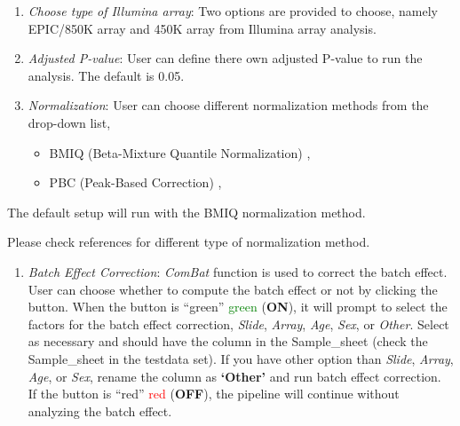 \documentclass[
  a4paper,
  DIV=11,
  numbers=noendperiod,
  oneside,
  open=any]{scrreport}
\providecommand{\tightlist}{%
  \setlength{\itemsep}{0pt}\setlength{\parskip}{0pt}}\usepackage{longtable,booktabs,array}
\begin{document}
\begin{enumerate}
\def\labelenumi{\arabic{enumi}.}
\item
  \emph{Choose type of Illumina array}: Two options are provided to
  choose, namely EPIC/850K array and 450K array from Illumina array
  analysis.
\item
  \emph{Adjusted P-value}: User can define there own adjusted P-value to
  run the analysis. The default is 0.05.
\item
  \emph{Normalization}: User can choose different normalization methods
  from the drop-down list,

  \begin{itemize}
  \tightlist
  \item
    BMIQ (Beta-Mixture Quantile Normalization)
    \autocite{teschendorff2013beta},
  \item
    PBC (Peak-Based Correction) \autocite{dedeurwaerder2011evaluation},
  \end{itemize}
\end{enumerate}

The default setup will run with the BMIQ normalization method.

\begin{tcolorbox}[enhanced jigsaw, breakable, colback=white, colbacktitle=quarto-callout-tip-color!10!white, opacityback=0, left=2mm, bottomrule=.15mm, opacitybacktitle=0.6, coltitle=black, bottomtitle=1mm, toprule=.15mm, toptitle=1mm, arc=.35mm, titlerule=0mm, rightrule=.15mm, title=\textcolor{quarto-callout-tip-color}{\faLightbulb}\hspace{0.5em}{Tip}, colframe=quarto-callout-tip-color-frame, leftrule=.75mm]

Please check references for different type of normalization method.

\end{tcolorbox}

\begin{enumerate}
\def\labelenumi{\arabic{enumi}.}
\setcounter{enumi}{3}
\tightlist
\item
  \emph{Batch Effect Correction}: \emph{ComBat} function is used to
  correct the batch effect. User can choose whether to compute the batch
  effect or not by clicking the button. When the button is {``green''}
  \textcolor{green}{green} (\textbf{ON}), it will prompt to select the
  factors for the batch effect correction, \emph{Slide}, \emph{Array},
  \emph{Age}, \emph{Sex}, or \emph{Other}. Select as necessary and
  should have the column in the Sample\_sheet (check the Sample\_sheet
  in the testdata set). If you have other option than \emph{Slide},
  \emph{Array}, \emph{Age}, or \emph{Sex}, rename the column as
  \textbf{`Other'} and run batch effect correction.\\
  If the button is {``red''} \textcolor{red}{red} (\textbf{OFF}), the
  pipeline will continue without analyzing the batch effect.
\end{enumerate}
\end{document}
